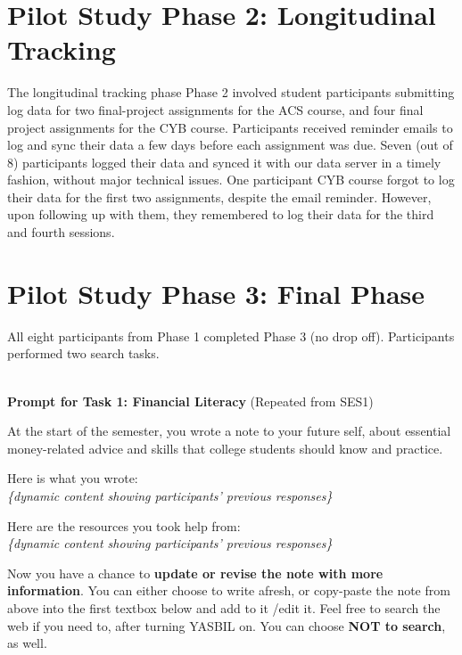 \documentclass[letterpaper, nobind]{templates/ociamthesis}
\begin{document}
\hypertarget{pilot-study-phase-2-longitudinal-tracking}{%
\section{Pilot Study Phase 2: Longitudinal Tracking}\label{pilot-study-phase-2-longitudinal-tracking}}

The longitudinal tracking phase Phase 2 involved student participants
submitting log data for two final-project assignments for the ACS
course, and four final project assignments for the CYB course.
Participants received reminder emails to log and sync their data a few
days before each assignment was due. Seven (out of 8) participants
logged their data and synced it with our data server in a timely
fashion, without major technical issues. One participant CYB course
forgot to log their data for the first two assignments, despite the
email reminder. However, upon following up with them, they remembered to
log their data for the third and fourth sessions.

\hypertarget{sec-app-pilot-ses3}{%
\section{Pilot Study Phase 3: Final Phase}\label{sec-app-pilot-ses3}}

All eight participants from Phase 1 completed Phase 3 (no drop off).
Participants performed two search tasks.

~\\
\textbf{Prompt for Task 1: Financial Literacy} (Repeated from SES1)

At the start of the semester, you wrote a note to your future self,
about essential money-related advice and skills that college students
should know and practice.

Here is what you wrote:\\
\emph{\{dynamic content showing participants' previous responses\}}

Here are the resources you took help from:\\
\emph{\{dynamic content showing participants' previous responses\}}

Now you have a chance to \textbf{update or revise the note with more
information}. You can either choose to write afresh, or copy-paste the
note from above into the first textbox below and add to it /edit it.
Feel free to search the web if you need to, after turning YASBIL on. You
can choose \textbf{NOT to search}, as well.
\end{document}
